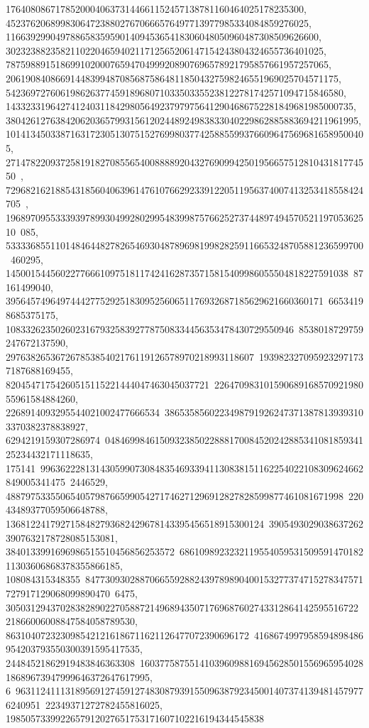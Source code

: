 {{{   176408086717852000406373144661152457138781160464025178235300, 
   4523762068998306472388027670666576497713977985334084859276025, 
   116639299049788658359590140945365418306048050960487308509626600, 
   3023238823582110220465940211712565206147154243804324655736401025, 
   78759889151869910200076594704999208907696578921795857661957257065, 
   2061908408669144839948708568758648118504327598246551969025704571175, 
   54236972760619862637745918968071033503355238122781742571094715846580, 
   1433233196427412403118429805649237979756412904686752281849681985000735, 
   38042612763842062036579931561202448924983833040229862885883694211961995, 
   1014134503387163172305130751527699803774258855993766096475696816589500405, 
   27147822093725819182708556540088889204327690994250195665751281043181774550\
, 
   729682162188543185604063961476107662923391220511956374007413253418558424705\
, 
   19689709553339397899304992802995483998757662527374489749457052119705362510\
085, 533336855110148464482782654693048789698199828259116653248705881236599700\
460295, 145001544560227766610975181174241628735715815409986055504818227591038\
87161499040, 3956457496497444277529251830952560651176932687185629621660360171\
66534198685375175, 1083326235026023167932583927787508334456353478430729550946\
8538018729759247672137590, 29763826536726785385402176119126578970218993118607\
1939823270959232971737187688169455, 82045471754260515115221444047463045037721\
22647098310159068916857092198055961584884260, 2268914093295544021002477666534\
38653585602234987919262473713878139393103370382378838927, 6294219159307286974\
048469984615093238502288817008452024288534108185934125234432171118635, 175141\
99636222813143059907308483546933941130838151162254022108309624662849005341475\
2446529, 48879753355065405798766599054271746271296912827828599877461081671998\
22043489377059506648788, 1368122417927158482793682429678143395456518915300124\
39054930290386372623907632178728085153081, 3840133991696986515510456856253572\
686109892323211955405953150959147018211303606868378355866185, 108084315348355\
84773093028870665592882439789890400153277374715278347571727917129068099890470\
6475, 30503129437028382890227058872149689435071769687602743312864142595516722\
21866006008847584058789530, 8631040723230985421216186711621126477072390696172\
4168674997958594898486954203793550300391595417535, 24484521862919483846363308\
16037758755141039609881694562850155696595402818689673947999646372647617995, 6\
96311241113189569127459127483087939155096387923450014073741394814579776240951\
22349371272782455816025, 1985057339922657912027651753171607102216194344545838\
}}}

